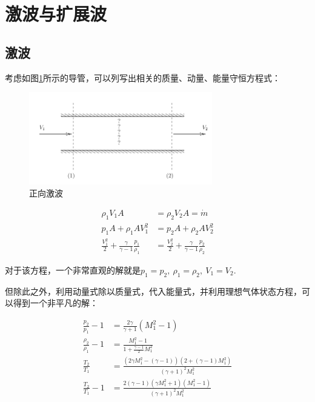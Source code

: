 \section{激波与扩展波}

\subsection{激波}

考虑如图\ref{1}所示的导管，可以列写出相关的质量、动量、能量守恒方程式：

\begin{figure}[!ht]
    \centering
    \includegraphics[width=8cm]{figures/1.png}
    \caption{正向激波}
    \label{1}
\end{figure}

\begin{align*}
    \rho_{1} V_{1} A&=\rho_{2} V_{2} A = \dot{m} \\ 
    p_{1} A+\rho_{1} A V_{1}^{2}&=p_{2} A+\rho_{2} A V_{2}^{2}\\ 
    \frac{V_{1}^{2}}{2}+\frac{\gamma}{\gamma-1} \frac{p_{1}}{\rho_{1}}&=\frac{V_{2}^{2}}{2}+\frac{\gamma}{\gamma-1} \frac{p_{2}}{\rho_{2}}
\end{align*}

对于该方程，一个非常直观的解就是$p_1=p_2,\ \rho_1=\rho_2,\ V_1=V_2$.

但除此之外，利用动量式除以质量式，代入能量式，并利用理想气体状态方程，可以得到一个非平凡的解：

\begin{align*}
    \frac{p_{2}}{p_{1}}-1&=\frac{2 \gamma}{\gamma+1}\left(M_{1}^{2}-1\right)\\ 
    \frac{\rho_{2}}{\rho_{1}}-1&=\frac{M_{1}^{2}-1}{1+\frac{\gamma-1}{2} M_{1}^{2}}\\ 
    \frac{T_{2}}{T_{1}}&=\frac{\left(2 \gamma M_{1}^{2}-(\gamma-1)\right)\left(2+(\gamma-1) M_{1}^{2}\right)}{(\gamma+1)^{2} M_{1}^{2}}\\ 
    \frac{T_{2}}{T_{1}}-1&=\frac{2(\gamma-1)\left(\gamma M_{1}^{2}+1\right)\left(M_{1}^{2}-1\right)}{(\gamma+1)^{2} M_{1}^{2}}
\end{align*}

